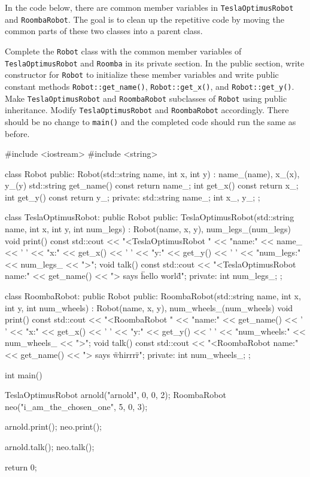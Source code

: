 

\nextq
In the code below, there are common member variables in
\verb!TeslaOptimusRobot!
and
\verb!RoombaRobot!.
The goal is to clean up the repetitive code by moving the common
parts of these two classes into a parent class.
\begin{enumerate}[nosep]
\li Complete the \verb!Robot! class with the common member variables of
\verb!TeslaOptimusRobot! and \verb!Roomba! in its private section.
\li In the public section, write constructor for \verb!Robot! to initialize these member variables
and write public constant methods \verb!Robot::get_name()!,
\verb!Robot::get_x()!, and \verb!Robot::get_y()!.
\li
Make \verb!TeslaOptimusRobot! and \verb!RoombaRobot! subclasses of \verb!Robot!
using public inheritance.
Modify \verb!TeslaOptimusRobot! and \verb!RoombaRobot! accordingly.
\li There should be no change to \verb!main()!
and the completed code should run the same as before.
\end{enumerate}
\ANSWER
\begin{answercode}
#include <iostream>
#include <string>

class Robot
{
public:
Robot(std::string name, int x, int y)
: name_(name), x_(x), y_(y)
{}
std::string get_name() const
{
  return name_;
}
int get_x() const
{
  return x_;
}
int get_y() const
{
  return y_;
}
private:
std::string name_;
int x_, y_;
};

class TeslaOptimusRobot: public Robot
{
public:
    TeslaOptimusRobot(std::string name, int x, int y, int num_legs)
        : Robot(name, x, y), num_legs_(num_legs)
    {}
    void print() const
    {
        std::cout << "<TeslaOptimusRobot "
                  << "name:" << name_ << ' '
                  << "x:" << get_x() << ' '
                  << "y:" << get_y() << ' '
                  << "num_legs:" << num_legs_
                  << ">\n";
    }
    void talk() const
    {
        std::cout << "<TeslaOptimusRobot name:"
                  << get_name()
                  << "> says \"hello world\"\n";
    }
private:
    int num_legs_;
};

class RoombaRobot: public Robot
{
public:
    RoombaRobot(std::string name, int x, int y, int num_wheels)
        : Robot(name, x, y), num_wheels_(num_wheels)
    {}
    void print() const
    {
        std::cout << "<RoombaRobot "
                  << "name:" << get_name() << ' '
                  << "x:" << get_x() << ' '
                  << "y:" << get_y() << ' '
                  << "num_wheels:" << num_wheels_
                  << ">\n";
    }
    void talk() const
    {
        std::cout << "<RoombaRobot name:"
                  << get_name()
                  << "> says \"whirrrr\"\n";
    }
private:
    int num_wheels_;
};

int main()
{
    TeslaOptimusRobot arnold("arnold", 0, 0, 2);
    RoombaRobot neo("i_am_the_chosen_one", 5, 0, 3);

    arnold.print();
    neo.print();

    arnold.talk();
    neo.talk();

    return 0;
}
\end{answercode}


